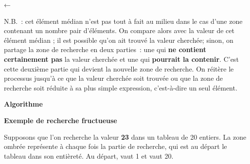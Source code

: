 	{\centering
	\textsf{←}{
	}
	\par}

	N.B.~: cet élément médian n'est pas tout à fait au milieu dans 
	le cas d'une zone contenant un nombre pair d'éléments.
	On compare alors 
	avec la valeur de cet élément médian ; il est possible qu’on ait trouvé
	la valeur cherchée; sinon, on partage la zone de recherche en deux
	parties~: une qui \textbf{ne contient certainement pas}
	la valeur cherchée et une qui \textbf{pourrait la
	contenir}. C’est cette deuxième partie qui 
	devient la nouvelle zone de recherche. On
	réitère le processus jusqu’à ce que la valeur cherchée soit trouvée ou
	que la zone de recherche soit réduite à sa plus simple expression,
	c’est-à-dire un seul élément.

	{\sffamily\bfseries
	Algorithme}
	
		
		{\sffamily\bfseries\upshape
		Exemple de recherche fructueuse}

		Supposons que l’on recherche la valeur
		\textbf{23} dans un
		tableau de 20 entiers. La zone ombrée représente à chaque fois la
		partie de recherche, qui est au départ le tableau dans son entièreté.
		Au départ,
		 vaut 1 et
			vaut 20.
			
